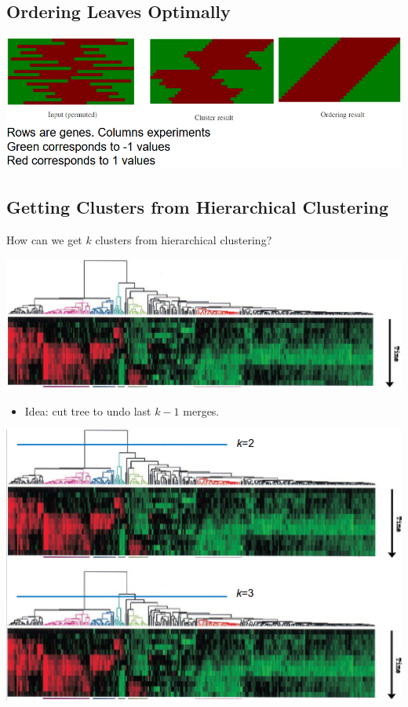 \documentclass[10pt]{article}
\begin{document}
\subsection*{Ordering Leaves Optimally}
\begin{center}
    \includegraphics[width=\textwidth]{W6_19.png}
\end{center}

\subsection*{Getting Clusters from Hierarchical Clustering}
How can we get $k$ clusters from hierarchical clustering?
\begin{center}
    \includegraphics[width=\textwidth]{W6_20.png}
\end{center}
\begin{itemize}
    \item Idea: cut tree to undo last $k - 1$ merges.
\end{itemize}
\begin{center}
    \includegraphics[width=\textwidth]{W6_21.png}
\end{center}
\end{document}
